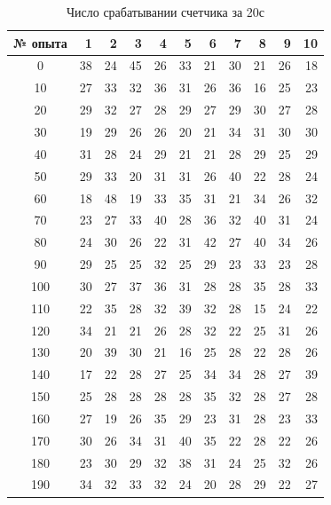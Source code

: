 \documentclass[a4paper, 12pt]{article}
\begin{document}
    \newpage
    \begin{table}[H]
    \begin{center}
    \begin{tabular}{|c|r|r|r|r|r|r|r|r|r|r|}
    \hline
    {№ опыта} &   1 &   2 &   3 &   4 &   5 &   6 &   7 &   8 &   9 &  10 \\
    \hline
    0   &  38 &  24 &  45 &  26 &  33 &  21 &  30 &  21 &  26 &  18 \\
    10  &  27 &  33 &  32 &  36 &  31 &  26 &  36 &  16 &  25 &  23 \\
    20  &  29 &  32 &  27 &  28 &  29 &  27 &  29 &  30 &  27 &  28 \\
    30  &  19 &  29 &  26 &  26 &  20 &  21 &  34 &  31 &  30 &  30 \\
    40  &  31 &  28 &  24 &  29 &  21 &  21 &  28 &  29 &  25 &  29 \\
    50  &  29 &  33 &  20 &  31 &  31 &  26 &  40 &  22 &  28 &  24 \\
    60  &  18 &  48 &  19 &  33 &  35 &  31 &  21 &  34 &  26 &  32 \\
    70  &  23 &  27 &  33 &  40 &  28 &  36 &  32 &  40 &  31 &  24 \\
    80  &  24 &  30 &  26 &  22 &  31 &  42 &  27 &  40 &  34 &  26 \\
    90  &  29 &  25 &  25 &  32 &  25 &  29 &  23 &  33 &  23 &  28 \\
    100 &  30 &  27 &  37 &  36 &  31 &  28 &  28 &  35 &  28 &  33 \\
    110 &  22 &  35 &  28 &  32 &  39 &  32 &  28 &  15 &  24 &  22 \\
    120 &  34 &  21 &  21 &  26 &  28 &  32 &  22 &  25 &  31 &  26 \\
    130 &  20 &  39 &  30 &  21 &  16 &  25 &  28 &  22 &  28 &  26 \\
    140 &  17 &  22 &  28 &  27 &  25 &  34 &  34 &  28 &  27 &  39 \\
    150 &  25 &  28 &  28 &  28 &  28 &  35 &  32 &  28 &  27 &  28 \\
    160 &  27 &  19 &  26 &  35 &  29 &  23 &  31 &  28 &  23 &  33 \\
    170 &  30 &  26 &  34 &  31 &  40 &  35 &  22 &  28 &  22 &  26 \\
    180 &  23 &  30 &  29 &  32 &  38 &  31 &  24 &  25 &  32 &  26 \\
    190 &  34 &  32 &  33 &  32 &  24 &  20 &  28 &  29 &  22 &  27 \\
    \hline
    \end{tabular}
    \caption{Число срабатывании счетчика за 20с}
    \end{center}
    \end{table}
\end{document}

